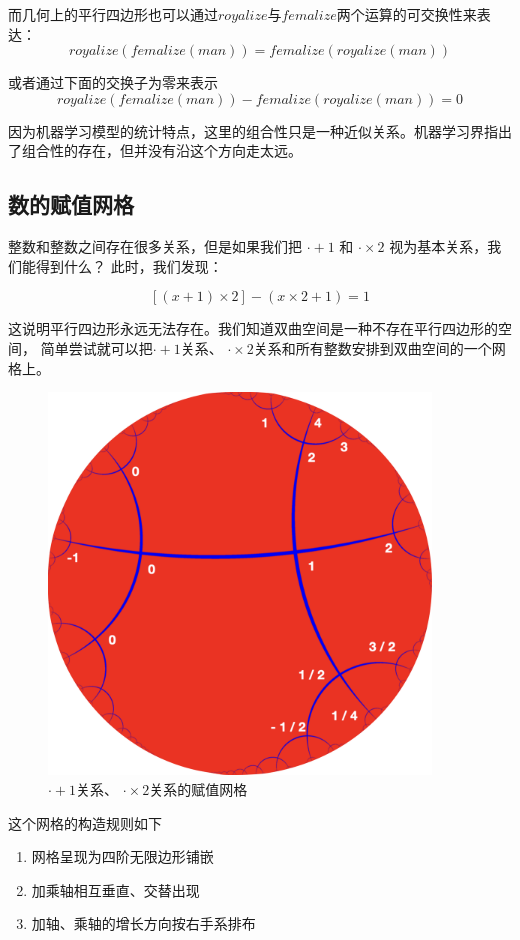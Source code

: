 \documentclass[a4paper,12pt]{article}
\numberwithin{definition}{section}
\numberwithin{lemma}{section}
\numberwithin{proposition}{section}
\numberwithin{theorem}{section}
\numberwithin{grammar}{section}
\numberwithin{program}{section}
\numberwithin{convention}{section}
\numberwithin{corollary}{section}
\begin{document}
而几何上的平行四边形也可以通过$royalize$与$femalize$两个运算的可交换性来表达：
$$
    royalize(femalize(man)) = femalize(royalize(man))
$$

或者通过下面的交换子为零来表示
$$
    royalize(femalize(man)) - femalize(royalize(man)) = 0
$$

因为机器学习模型的统计特点，这里的组合性只是一种近似关系。机器学习界指出了组合性的存在，但并没有沿这个方向走太远。

\subsection{数的赋值网格}\label{subsec:assignment}

整数和整数之间存在很多关系，但是如果我们把 $\cdot + 1$ 和 $\cdot \times 2$ 视为基本关系，我们能得到什么？ 此时，我们发现：

$$
[(x + 1) \times 2] - (x \times 2 + 1) = 1
$$

这说明平行四边形永远无法存在。我们知道双曲空间是一种不存在平行四边形的空间，
简单尝试就可以把$\cdot + 1$关系、 $\cdot \times 2$关系和所有整数安排到双曲空间的一个网格上。

\begin{figure}[ht]
\centering
\includegraphics[width=4in]{images/assignment2.png}
\caption{$\cdot + 1$关系、 $\cdot \times 2$关系的赋值网格}
\end{figure}

这个网格的构造规则如下
\begin{enumerate}
    \item 网格呈现为四阶无限边形铺嵌
    \item 加乘轴相互垂直、交替出现
    \item 加轴、乘轴的增长方向按右手系排布
\end{enumerate}
\end{document}
